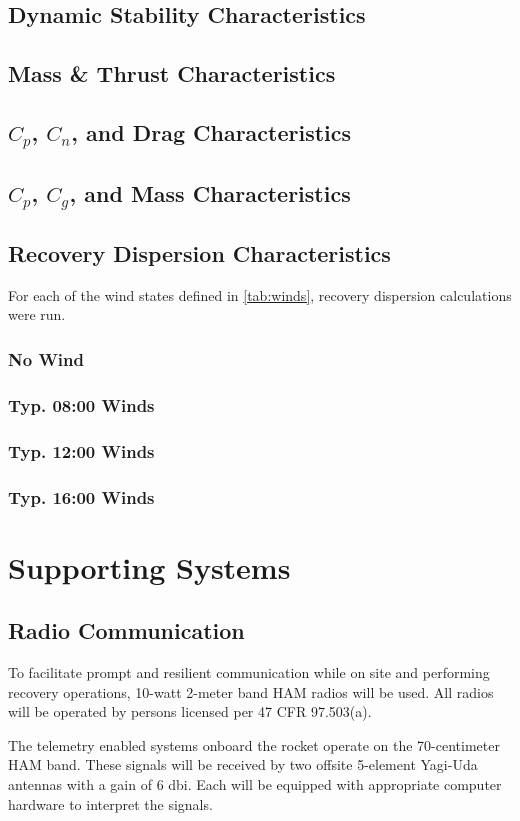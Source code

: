 \documentclass[12pt]{article}
\begin{document}
\subsection{Dynamic Stability Characteristics}
\subsection{Mass \& Thrust Characteristics}
\subsection{$C_p$, $C_n$, and Drag Characteristics}
\subsection{$C_p$, $C_g$, and Mass Characteristics}
\subsection{Recovery Dispersion Characteristics}
For each of the wind states defined in \cref{tab:winds},
recovery dispersion calculations were run.
\subsubsection{No Wind}
\subsubsection{Typ. 08:00 Winds}
\subsubsection{Typ. 12:00 Winds}
\subsubsection{Typ. 16:00 Winds}
\section{Supporting Systems}
\subsection{Radio Communication}
To facilitate prompt and resilient communication while on site and performing recovery operations,
10-watt 2-meter band HAM radios will be used.
All radios will be operated by persons licensed per 47 CFR 97.503(a).

The telemetry enabled systems onboard the rocket operate on the 70-centimeter HAM band.
These signals will be received by two offsite 5-element Yagi-Uda antennas with a gain of 6 dbi.
Each will be equipped with appropriate computer hardware to interpret the signals.
\end{document}
